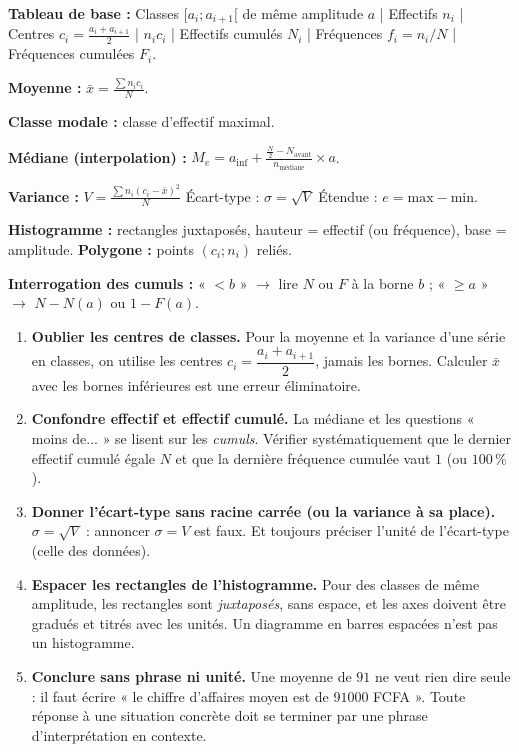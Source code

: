\documentclass[11pt]{article}
\begin{document}
\begin{aretenir}
\textbf{Tableau de base :} Classes $[a_i;a_{i+1}[$ de même amplitude $a$ | Effectifs $n_i$ | Centres $c_i=\frac{a_i+a_{i+1}}{2}$ | $n_ic_i$ | Effectifs cumulés $N_i$ | Fréquences $f_i=n_i/N$ | Fréquences cumulées $F_i$.
\smallskip

\textbf{Moyenne :} $\bar{x}=\frac{\sum n_ic_i}{N}$.
\smallskip

\textbf{Classe modale :} classe d'effectif maximal.
\smallskip

\textbf{Médiane (interpolation) :} $M_e = a_{\text{inf}} + \frac{\frac{N}{2}-N_{\text{avant}}}{n_{\text{médiane}}}\times a$.
\smallskip

\textbf{Variance :} $V=\frac{\sum n_i(c_i-\bar{x})^2}{N}$ \quad Écart-type : $\sigma=\sqrt{V}$ \quad Étendue : $e = \text{max} - \text{min}$.
\smallskip

\textbf{Histogramme :} rectangles juxtaposés, hauteur = effectif (ou fréquence), base = amplitude.
\textbf{Polygone :} points $(c_i; n_i)$ reliés.
\smallskip

\textbf{Interrogation des cumuls :} « $< b$ » $\to$ lire $N$ ou $F$ à la borne $b$ ; « $\ge a$ » $\to$ $N - N(a)$ ou $1-F(a)$.
\end{aretenir}

\begin{attention}
\begin{enumerate}
\item \textbf{Oublier les centres de classes.} Pour la moyenne et la variance d'une série en classes, on utilise les centres $c_i=\dfrac{a_i+a_{i+1}}{2}$, jamais les bornes. Calculer $\bar{x}$ avec les bornes inférieures est une erreur éliminatoire.
\item \textbf{Confondre effectif et effectif cumulé.} La médiane et les questions « moins de... » se lisent sur les \emph{cumuls}. Vérifier systématiquement que le dernier effectif cumulé égale $N$ et que la dernière fréquence cumulée vaut $1$ (ou $100\,\%$).
\item \textbf{Donner l'écart-type sans racine carrée (ou la variance à sa place).} $\sigma=\sqrt{V}$ : annoncer $\sigma=V$ est faux. Et toujours préciser l'unité de l'écart-type (celle des données).
\item \textbf{Espacer les rectangles de l'histogramme.} Pour des classes de même amplitude, les rectangles sont \emph{juxtaposés}, sans espace, et les axes doivent être gradués et titrés avec les unités. Un diagramme en barres espacées n'est pas un histogramme.
\item \textbf{Conclure sans phrase ni unité.} Une moyenne de $91$ ne veut rien dire seule : il faut écrire « le chiffre d'affaires moyen est de $\num{91000}$ FCFA ». Toute réponse à une situation concrète doit se terminer par une phrase d'interprétation en contexte.
\end{enumerate}
\end{attention}
\end{document}
